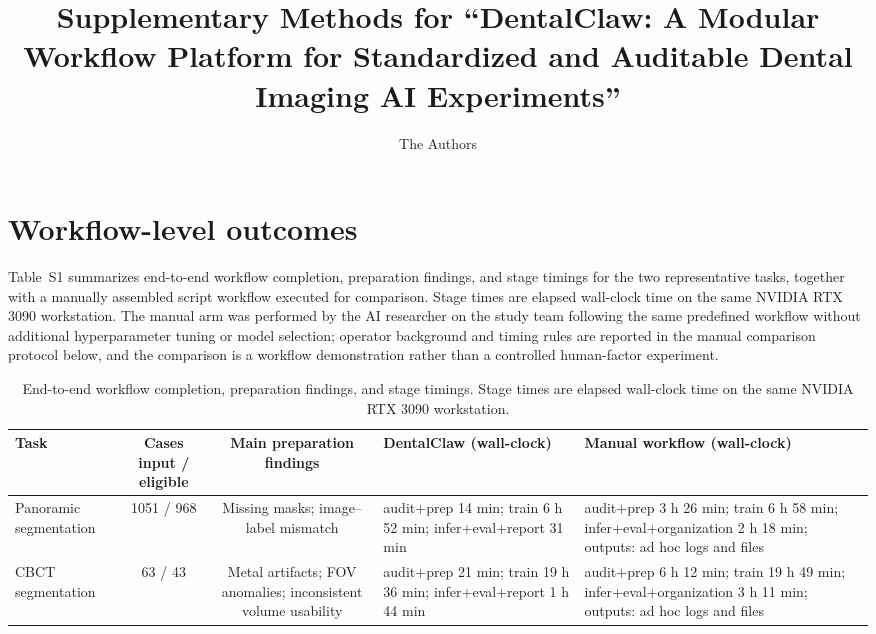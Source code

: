 \documentclass[11pt]{article}
\begin{document}
\title{Supplementary Methods for ``DentalClaw: A Modular Workflow Platform for Standardized and Auditable Dental Imaging AI Experiments''}
\author{The Authors}
\date{}
\maketitle

\section{Workflow-level outcomes}

Table~S1 summarizes end-to-end workflow completion, preparation findings, and stage timings for the two representative tasks, together with a manually assembled script workflow executed for comparison. Stage times are elapsed wall-clock time on the same NVIDIA RTX 3090 workstation. The manual arm was performed by the AI researcher on the study team following the same predefined workflow without additional hyperparameter tuning or model selection; operator background and timing rules are reported in the manual comparison protocol below, and the comparison is a workflow demonstration rather than a controlled human-factor experiment.

\begin{table}[!ht]
\centering
\small
\setlength{\tabcolsep}{4pt}
\caption{End-to-end workflow completion, preparation findings, and stage timings. Stage times are elapsed wall-clock time on the same NVIDIA RTX 3090 workstation.}
\label{tab:supp_workflow}
\begin{tabular}{l c c p{4.6cm} p{4.8cm}}
\toprule
Task & Cases input / eligible & Main preparation findings & DentalClaw (wall-clock) & Manual workflow (wall-clock) \\
\midrule
Panoramic segmentation & 1051 / 968 & Missing masks; image--label mismatch & audit+prep 14 min; train 6 h 52 min; infer+eval+report 31 min & audit+prep 3 h 26 min; train 6 h 58 min; infer+eval+organization 2 h 18 min; outputs: ad hoc logs and files \\
\addlinespace
CBCT segmentation & 63 / 43 & Metal artifacts; FOV anomalies; inconsistent volume usability & audit+prep 21 min; train 19 h 36 min; infer+eval+report 1 h 44 min & audit+prep 6 h 12 min; train 19 h 49 min; infer+eval+organization 3 h 11 min; outputs: ad hoc logs and files \\
\bottomrule
\end{tabular}
\end{table}
\end{document}
